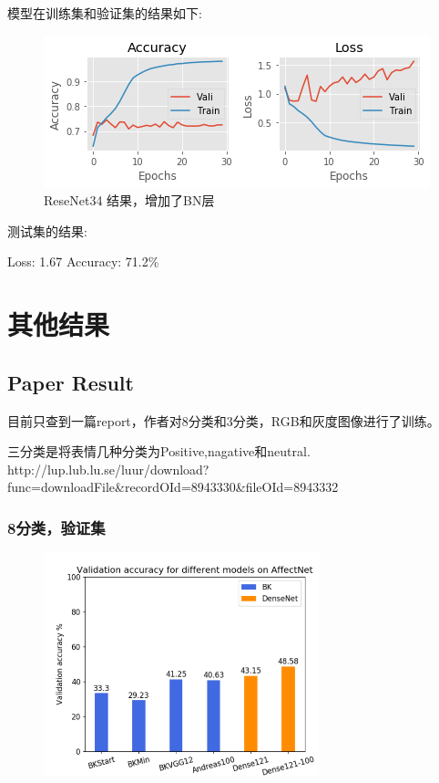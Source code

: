 \documentclass[11pt, a4paper]{article}
\begin{document}
\begin{CJK}{UTF8}{gbsn}
模型在训练集和验证集的结果如下:

	\begin{figure}[htbp]
		
		\centering %
		\includegraphics[width=12cm]{resnet34}
		
		\caption{ReseNet34 结果，增加了BN层}
		\label{Fig:result}
	\end{figure}

测试集的结果:

Loss: 1.67 Accuracy: 71.2\%
	
\section{其他结果}
\subsection{Paper Result}
目前只查到一篇report，作者对8分类和3分类，RGB和灰度图像进行了训练。

三分类是将表情几种分类为Positive,nagative和neutral.
http://lup.lub.lu.se/luur/download?func=downloadFile\&recordOId=8943330\&fileOId=8943332

\subsubsection{8分类，验证集}

	\begin{figure}[htbp]
	
	\centering %
	\includegraphics[width=8cm]{result}
	

\end{figure}
\end{CJK}
\end{document}
